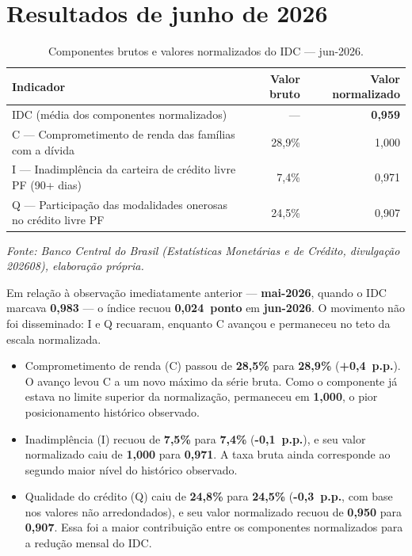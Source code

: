 \documentclass[11pt,a4paper]{article}
\newcommand{\fonte}[1]{%
  \par\vspace{0.2\baselineskip}%
  \small\textit{Fonte: #1}\par\vspace{0.8\baselineskip}%
}
\newcommand{\mesreferencia}{junho de 2026}
\newcommand{\mesref}{jun-2026}
\newcommand{\mesanterior}{mai-2026}
\newcommand{\competencia}{202608}
\begin{document}
\section{Resultados de \mesreferencia}

\begin{table}[htbp]
  \centering
  \caption{Componentes brutos e valores normalizados do IDC --- \mesref.}
  \label{tab:componentes}
  \begin{tabular}{p{8.0cm}rr}
    \toprule
    Indicador & Valor bruto & Valor normalizado \\
    \midrule
    IDC (média dos componentes normalizados)
      & ---
      & \textbf{0,959} \\
    C --- Comprometimento de renda das famílias com a dívida
      & 28,9\%
      & 1,000 \\
    I --- Inadimplência da carteira de crédito livre PF (90+ dias)
      & 7,4\%
      & 0,971 \\
    Q --- Participação das modalidades onerosas no crédito livre PF
      & 24,5\%
      & 0,907 \\
    \bottomrule
  \end{tabular}
\end{table}

\fonte{Banco Central do Brasil (Estatísticas Monetárias e de Crédito,
divulgação \competencia), elaboração própria.}

Em relação à observação imediatamente anterior --- \textbf{\mesanterior}, quando o IDC
marcava \textbf{0,983} --- o índice recuou
\textbf{0,024~ponto} em \textbf{\mesref}.
O movimento não foi disseminado: I e Q recuaram, enquanto C avançou e permaneceu
no teto da escala normalizada.

\begin{itemize}
  \item Comprometimento de renda (C) passou de \textbf{28,5\%} para
    \textbf{28,9\%} (\textbf{+0,4~p.p.}). O avanço levou C a um novo máximo
    da série bruta. Como o componente já estava no limite superior da normalização,
    permaneceu em \textbf{1,000}, o pior posicionamento histórico observado.

  \item Inadimplência (I) recuou de \textbf{7,5\%} para \textbf{7,4\%}
    (\textbf{-0,1~p.p.}), e seu valor normalizado caiu de \textbf{1,000} para
    \textbf{0,971}. A taxa bruta ainda corresponde ao segundo maior nível do
    histórico observado.

  \item Qualidade do crédito (Q) caiu de \textbf{24,8\%} para \textbf{24,5\%}
    (\textbf{-0,3~p.p.}, com base nos valores não arredondados), e seu valor
    normalizado recuou de \textbf{0,950} para \textbf{0,907}. Essa foi a maior
    contribuição entre os componentes normalizados para a redução mensal do IDC.
\end{itemize}
\end{document}
